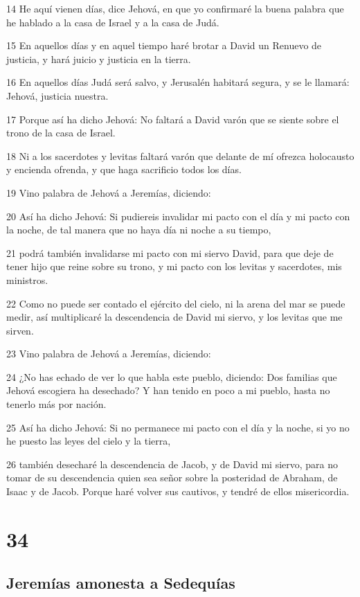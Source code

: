 \par 14 He aquí vienen días, dice Jehová, en que yo confirmaré la buena palabra que he hablado a la casa de Israel y a la casa de Judá.
\par 15 En aquellos días y en aquel tiempo haré brotar a David un Renuevo de justicia, y hará juicio y justicia en la tierra.
\par 16 En aquellos días Judá será salvo, y Jerusalén habitará segura, y se le llamará: Jehová, justicia nuestra. 
\par 17 Porque así ha dicho Jehová: No faltará a David varón que se siente sobre el trono de la casa de Israel. 
\par 18 Ni a los sacerdotes y levitas faltará varón que delante de mí ofrezca holocausto y encienda ofrenda, y que haga sacrificio todos los días. 
\par 19 Vino palabra de Jehová a Jeremías, diciendo:
\par 20 Así ha dicho Jehová: Si pudiereis invalidar mi pacto con el día y mi pacto con la noche, de tal manera que no haya día ni noche a su tiempo,
\par 21 podrá también invalidarse mi pacto con mi siervo David, para que deje de tener hijo que reine sobre su trono, y mi pacto con los levitas y sacerdotes, mis ministros.
\par 22 Como no puede ser contado el ejército del cielo, ni la arena del mar se puede medir, así multiplicaré la descendencia de David mi siervo, y los levitas que me sirven.
\par 23 Vino palabra de Jehová a Jeremías, diciendo:
\par 24 ¿No has echado de ver lo que habla este pueblo, diciendo: Dos familias que Jehová escogiera ha desechado? Y han tenido en poco a mi pueblo, hasta no tenerlo más por nación.
\par 25 Así ha dicho Jehová: Si no permanece mi pacto con el día y la noche, si yo no he puesto las leyes del cielo y la tierra,
\par 26 también desecharé la descendencia de Jacob, y de David mi siervo, para no tomar de su descendencia quien sea señor sobre la posteridad de Abraham, de Isaac y de Jacob. Porque haré volver sus cautivos, y tendré de ellos misericordia.

\chapter{34}

\section*{Jeremías amonesta a Sedequías}

